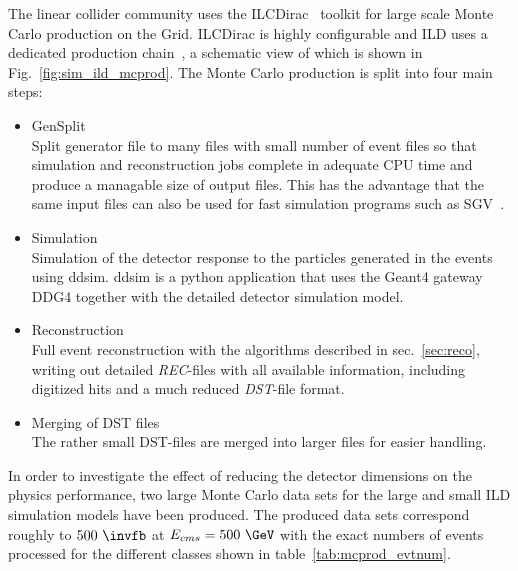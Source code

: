 The linear collider community uses the ILCDirac~\cite{Grefe:2014sca} toolkit for large scale Monte Carlo production on the Grid.
ILCDirac is highly configurable and ILD uses a dedicated production chain~\cite{Miyamoto:2019xve}, a schematic view of which is shown in Fig.~\ref{fig:sim_ild_mcprod}.
The Monte Carlo production is split into four main steps:
\begin{itemize}
\item GenSplit\\
  Split generator file to many files with small number of event files so that simulation and reconstruction jobs complete in adequate CPU time and 
produce a managable size of output files.  This has the advantage that the same input files can also be used for fast simulation programs such as SGV~\cite{Berggren:2012ar}.
\item Simulation\\
  Simulation of the detector response to the particles generated in the events using ddsim. ddsim is a python application that uses the Geant4 gateway
  DDG4 together with the detailed detector simulation model.
\item Reconstruction\\
  Full event reconstruction with the algorithms described in sec.~\ref{sec:reco}, writing out detailed \emph{REC}-files with all available information,
  including digitized hits and a much reduced \emph{DST}-file format.
\item{Merging of DST files}\\
  The rather small DST-files are merged into larger files for easier handling.
\end{itemize}
%
In order to investigate the effect of reducing the detector dimensions on the physics performance, two large Monte Carlo data sets for the large and small
ILD simulation models have been produced. The produced data sets correspond roughly to $500~\invfb$ at $E_{cms}=500~\GeV$ with the exact numbers of
events processed for the different classes shown in table~\ref{tab:mcprod_evtnum}.

